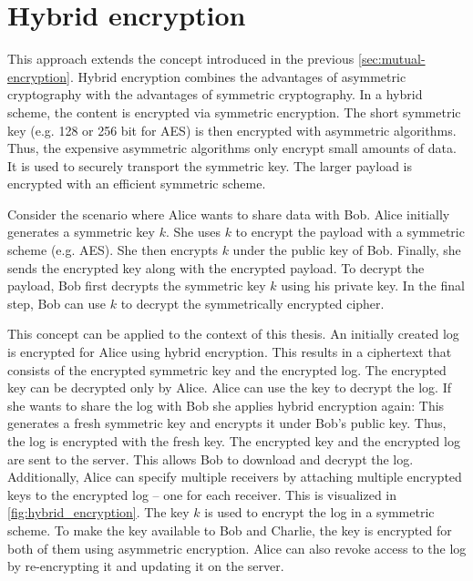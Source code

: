 \documentclass[../main.tex]{subfiles}
\begin{document}
\section{Hybrid encryption}
\label{sec:hybrid-encryption}

This approach extends the concept introduced in the previous \cref{sec:mutual-encryption}.
Hybrid encryption combines the advantages of asymmetric cryptography with the advantages of symmetric cryptography.
In a hybrid scheme, the content is encrypted via symmetric encryption.
The short symmetric key (e.g. 128 or 256 bit for AES) is then encrypted with asymmetric algorithms.
Thus, the expensive asymmetric algorithms only encrypt small amounts of data.
It is used to securely transport the symmetric key.
The larger payload is encrypted with an efficient symmetric scheme.
~\cite[340]{Eckert2018}

Consider the scenario where Alice wants to share data with Bob.
Alice initially generates a symmetric key $k$.
She uses $k$ to encrypt the payload with a symmetric scheme (e.g. AES).
She then encrypts $k$ under the public key of Bob.
Finally, she sends the encrypted key along with the encrypted payload.
To decrypt the payload, Bob first decrypts the symmetric key $k$ using his private key.
In the final step, Bob can use $k$ to decrypt the symmetrically encrypted cipher.

This concept can be applied to the context of this thesis.
An initially created log is encrypted for Alice using hybrid encryption.
This results in a ciphertext that consists of the encrypted symmetric key and the encrypted log.
The encrypted key can be decrypted only by Alice.
Alice can use the key to decrypt the log.
If she wants to share the log with Bob she applies hybrid encryption again:
This generates a fresh symmetric key and encrypts it under Bob's public key.
Thus, the log is encrypted with the fresh key.
The encrypted key and the encrypted log are sent to the server.
This allows Bob to download and decrypt the log.
Additionally, Alice can specify multiple receivers by attaching multiple encrypted keys to the encrypted log -- one for each receiver.
This is visualized in \cref{fig:hybrid_encryption}. 
The key $k$ is used to encrypt the log in a symmetric scheme.
To make the key available to Bob and Charlie, the key is encrypted for both of them using asymmetric encryption.
Alice can also revoke access to the log by re-encrypting it and updating it on the server. 
\end{document}
